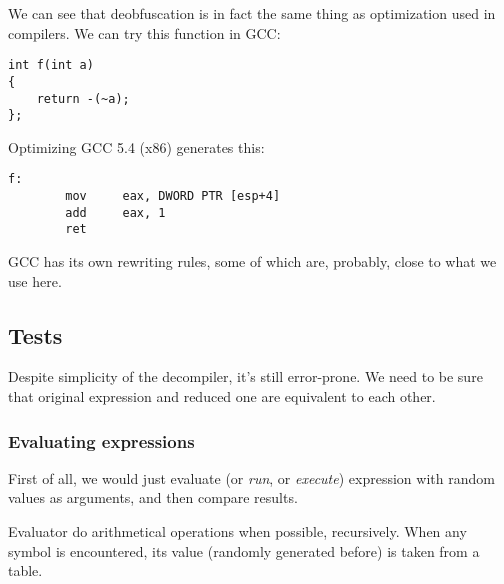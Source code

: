 We can see that deobfuscation is in fact the same thing as optimization used in compilers.
We can try this function in GCC:

\begin{lstlisting}
int f(int a)
{
	return -(~a);
};
\end{lstlisting}

Optimizing GCC 5.4 (x86) generates this:

\begin{lstlisting}
f:
        mov     eax, DWORD PTR [esp+4]
        add     eax, 1
        ret
\end{lstlisting}

GCC has its own rewriting rules, some of which are, probably, close to what we use here.

\subsection{Tests}

Despite simplicity of the decompiler, it's still error-prone.
We need to be sure that original expression and reduced one are equivalent to each other.

\subsubsection{Evaluating expressions}

First of all, we would just evaluate (or \textit{run}, or \textit{execute})
expression with random values as arguments, and then compare results.

Evaluator do arithmetical operations when possible, recursively.
When any symbol is encountered, its value (randomly generated before) is taken from a table.

